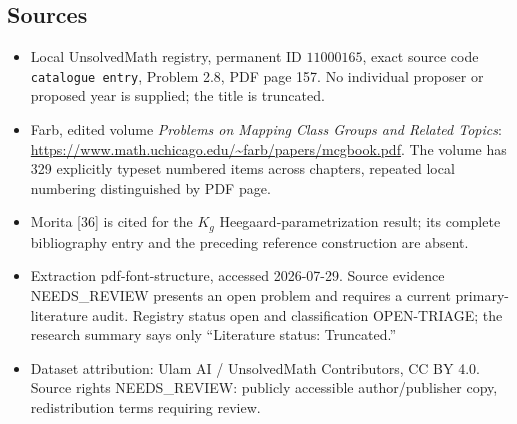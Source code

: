 \documentclass[11pt]{article}
\begin{document}
\subsection{Sources}
\begin{itemize}
\item Local UnsolvedMath registry, permanent ID \(11000165\), exact source code \texttt{catalogue entry}, Problem 2.8, PDF page 157. No individual proposer or proposed year is supplied; the title is truncated.
\item Farb, edited volume \emph{Problems on Mapping Class Groups and Related Topics}: \url{https://www.math.uchicago.edu/~farb/papers/mcgbook.pdf}. The volume has 329 explicitly typeset numbered items across chapters, repeated local numbering distinguished by PDF page.
\item Morita [36] is cited for the \(K_g\) Heegaard-parametrization result; its complete bibliography entry and the preceding reference construction are absent.
\item Extraction pdf-font-structure, accessed 2026-07-29. Source evidence NEEDS\_REVIEW presents an open problem and requires a current primary-literature audit. Registry status open and classification OPEN-TRIAGE; the research summary says only ``Literature status: Truncated.''
\item Dataset attribution: Ulam AI / UnsolvedMath Contributors, CC BY 4.0. Source rights NEEDS\_REVIEW: publicly accessible author/publisher copy, redistribution terms requiring review.
\end{itemize}
\end{document}
